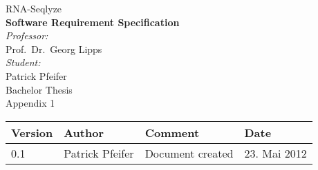 \begin{titlepage}
\thispagestyle{plain}
\begin{center}
%
{ \sffamily\Huge RNA-Seqlyze }
\\[1cm]
{ \sffamily\LARGE \bfseries Software Requirement Specification }
\\[2cm]
%
\large\emph{Professor:}\\
	Prof.~Dr.~Georg Lipps
\\[1cm]
\large\emph{Student:}\\
	Patrick Pfeifer
%
\\[2cm]
{ \LARGE Bachelor Thesis }\\[0.5cm]
{ \Large Appendix 1 }
%
\\\vfill
%
\listoftodos\vfill
%
\setlength{\aboverulesep}{0pt}
\setlength{\belowrulesep}{0pt}
\setlength{\extrarowheight}{.75ex}
\begin{tabularx}{\textwidth}{|p{1.6cm}|>{\raggedright}p{3cm}|X|p{3cm}|}
\midrule
\rowcolor[gray]{0.8}
	Version & Author & Comment & Date
\\\midrule
	  0.1
	& Patrick Pfeifer
	& Document created
	& 23. Mai 2012
\\\midrule
\end{tabularx}
\end{center}
\end{titlepage}
